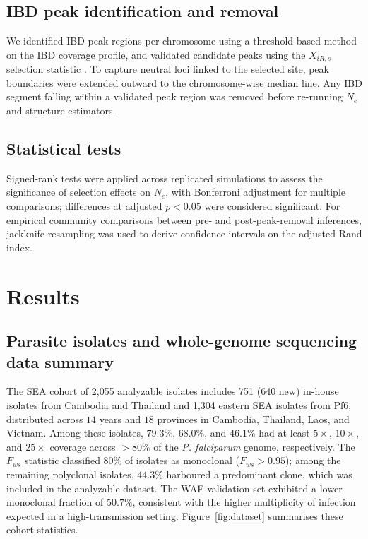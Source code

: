 \documentclass[11pt]{article}
\begin{document}
\subsection{IBD peak identification and removal}

We identified IBD peak regions per chromosome using a threshold-based method on the IBD coverage profile, and validated candidate peaks using the $X_{iR,s}$ selection statistic \citep{henden2018xirs}. To capture neutral loci linked to the selected site, peak boundaries were extended outward to the chromosome-wise median line. Any IBD segment falling within a validated peak region was removed before re-running $N_e$ and structure estimators.

\subsection{Statistical tests}

Signed-rank tests were applied across replicated simulations to assess the significance of selection effects on $N_e$, with Bonferroni adjustment for multiple comparisons; differences at adjusted $p < 0.05$ were considered significant. For empirical community comparisons between pre- and post-peak-removal inferences, jackknife resampling was used to derive confidence intervals on the adjusted Rand index.

\section{Results}

\subsection{Parasite isolates and whole-genome sequencing data summary}

The SEA cohort of 2,055 analyzable isolates includes 751 (640 new) in-house isolates from Cambodia and Thailand and 1,304 eastern SEA isolates from Pf6, distributed across $14$ years and $18$ provinces in Cambodia, Thailand, Laos, and Vietnam. Among these isolates, $79.3\%$, $68.0\%$, and $46.1\%$ had at least $5\times$, $10\times$, and $25\times$ coverage across $>80\%$ of the \textit{P. falciparum} genome, respectively. The $F_{ws}$ statistic classified $80\%$ of isolates as monoclonal ($F_{ws} > 0.95$); among the remaining polyclonal isolates, $44.3\%$ harboured a predominant clone, which was included in the analyzable dataset. The WAF validation set exhibited a lower monoclonal fraction of $50.7\%$, consistent with the higher multiplicity of infection expected in a high-transmission setting. Figure~\ref{fig:dataset} summarises these cohort statistics.
\end{document}
